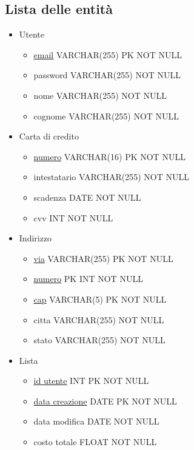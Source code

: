 \documentclass[11pt]{article}
\begin{document}
\subsection{Lista delle entità}
\begin{itemize}
	\item Utente
		\begin{itemize}
			\item \underline{email} VARCHAR(255) PK NOT NULL
			\item password VARCHAR(255) NOT NULL
			\item nome VARCHAR(255) NOT NULL
			\item cognome VARCHAR(255) NOT NULL
		\end{itemize}

	\item Carta di credito
		\begin{itemize}
			\item \underline{numero} VARCHAR(16) PK NOT NULL
			\item intestatario VARCHAR(255) NOT NULL
			\item scadenza DATE NOT NULL
			\item cvv INT NOT NULL
		\end{itemize}

	\item Indirizzo
		\begin{itemize}
			\item \underline{via} VARCHAR(255) PK NOT NULL
			\item \underline{numero} PK INT NOT NULL
			\item \underline{cap} VARCHAR(5) PK NOT NULL
			\item citta VARCHAR(255) NOT NULL
			\item stato VARCHAR(255) NOT NULL
		\end{itemize}

	\item Lista
		\begin{itemize}
			\item \underline{id utente} INT PK NOT NULL
			\item \underline{data creazione} DATE PK NOT NULL
			\item data modifica DATE NOT NULL
			\item costo totale FLOAT NOT NULL
		\end{itemize}

		\begin{adjustwidth}{2em}{0pt}


\end{adjustwidth}
\end{itemize}
\end{document}
